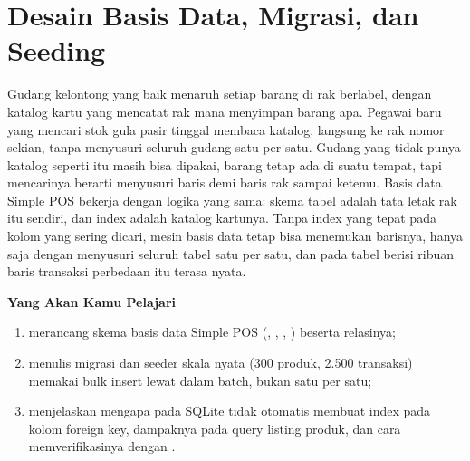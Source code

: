 
\chapter{Desain Basis Data, Migrasi, dan Seeding}
\label{ch:desain-basis-data}


Gudang kelontong yang baik menaruh setiap barang di rak berlabel, dengan
katalog kartu yang mencatat rak mana menyimpan barang apa. Pegawai baru
yang mencari stok gula pasir tinggal membaca katalog, langsung ke rak
nomor sekian, tanpa menyusuri seluruh gudang satu per satu. Gudang yang
tidak punya katalog seperti itu masih bisa dipakai, barang tetap ada di
suatu tempat, tapi mencarinya berarti menyusuri baris demi baris rak
sampai ketemu. Basis data Simple POS bekerja dengan logika yang sama:
skema tabel adalah tata letak rak itu sendiri, dan index adalah katalog
kartunya. Tanpa index yang tepat pada kolom yang sering dicari, mesin
basis data tetap bisa menemukan barisnya, hanya saja dengan menyusuri
seluruh tabel satu per satu, dan pada tabel berisi ribuan baris transaksi
perbedaan itu terasa nyata.

\textbf{Yang Akan Kamu Pelajari}

\begin{enumerate}
  \item merancang skema basis data Simple POS (, , , ) beserta relasinya;
  \item menulis migrasi dan seeder skala nyata (300 produk, 2.500 transaksi) memakai bulk insert lewat  dalam batch, bukan  satu per satu;
  \item menjelaskan mengapa  pada SQLite tidak otomatis membuat index pada kolom foreign key, dampaknya pada query listing produk, dan cara memverifikasinya dengan .
\end{enumerate}

